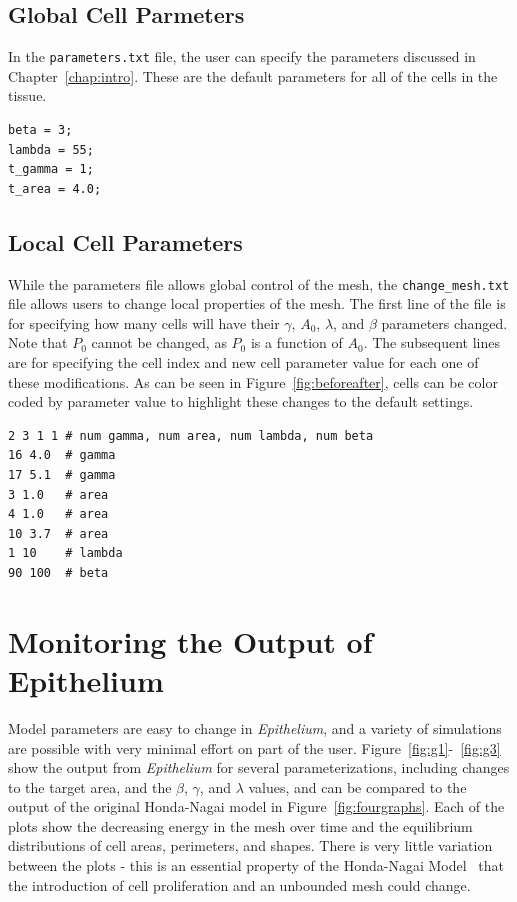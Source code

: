 \subsection{Global Cell Parmeters}
In the \texttt{parameters.txt} file, the user can specify the parameters discussed in Chapter~\ref{chap:intro}. These are the default parameters for all of the cells in the tissue.
\begin{lstlisting}
beta = 3;
lambda = 55;
t_gamma = 1;
t_area = 4.0;
\end{lstlisting}

\subsection{Local Cell Parameters}
While the parameters file allows global control of the mesh, the \texttt{change\_mesh.txt} file allows users to change local properties of the mesh. The first line of the file is for specifying how many cells will have their $\gamma$, $A_0$, $\lambda$, and $\beta$ parameters changed. Note that $P_0$ cannot be changed, as $P_0$ is a function of $A_0$. The subsequent lines are for specifying the cell index and new cell parameter value for each one of these modifications. As can be seen in Figure~\ref{fig:beforeafter}, cells can be color coded by parameter value to highlight these changes to the default settings.
\begin{lstlisting}
2 3 1 1 # num gamma, num area, num lambda, num beta
16 4.0  # gamma
17 5.1  # gamma
3 1.0   # area
4 1.0   # area
10 3.7  # area
1 10    # lambda
90 100  # beta
\end{lstlisting}

\section{Monitoring the Output of Epithelium}
Model parameters are easy to change in \emph{Epithelium}, and a variety of simulations are possible with very minimal effort on part of the user. Figure~\ref{fig:g1}-~\ref{fig:g3} show the output from \emph{Epithelium} for several parameterizations, including changes to the target area, and the $\beta$, $\gamma$, and $\lambda$ values, and can be compared to the output of the original Honda-Nagai model in Figure~\ref{fig:fourgraphs}. Each of the plots show the decreasing energy in the mesh over time and the equilibrium distributions of cell areas, perimeters, and shapes. There is very little variation between the plots - this is an essential property of the Honda-Nagai Model~\cite{HondaNagai} that the introduction of cell proliferation and an unbounded mesh could change.  


